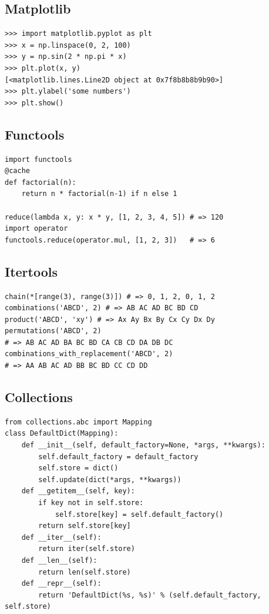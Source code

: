 \documentclass{article}
\begin{document}
\begin{multicols*}{4}
\subsection*{Matplotlib}
\begin{lstlisting}
>>> import matplotlib.pyplot as plt
>>> x = np.linspace(0, 2, 100)
>>> y = np.sin(2 * np.pi * x)
>>> plt.plot(x, y)
[<matplotlib.lines.Line2D object at 0x7f8b8b8b9b90>]
>>> plt.ylabel('some numbers')
>>> plt.show()
\end{lstlisting}

\subsection*{Functools}
\begin{lstlisting}
import functools 
@cache
def factorial(n):
    return n * factorial(n-1) if n else 1

reduce(lambda x, y: x * y, [1, 2, 3, 4, 5]) # => 120
import operator 
functools.reduce(operator.mul, [1, 2, 3])   # => 6
\end{lstlisting}

\subsection*{Itertools}
\begin{lstlisting}
chain(*[range(3), range(3)]) # => 0, 1, 2, 0, 1, 2
combinations('ABCD', 2) # => AB AC AD BC BD CD
product('ABCD', 'xy') # => Ax Ay Bx By Cx Cy Dx Dy
permutations('ABCD', 2) 
# => AB AC AD BA BC BD CA CB CD DA DB DC
combinations_with_replacement('ABCD', 2) 
# => AA AB AC AD BB BC BD CC CD DD
\end{lstlisting}

\subsection*{Collections}
\begin{lstlisting}
from collections.abc import Mapping
class DefaultDict(Mapping):
    def __init__(self, default_factory=None, *args, **kwargs):
        self.default_factory = default_factory
        self.store = dict()
        self.update(dict(*args, **kwargs))
    def __getitem__(self, key):
        if key not in self.store:
            self.store[key] = self.default_factory()
        return self.store[key]
    def __iter__(self):
        return iter(self.store)
    def __len__(self):
        return len(self.store)
    def __repr__(self):
        return 'DefaultDict(%s, %s)' % (self.default_factory, self.store)
\end{lstlisting}


\end{multicols*}
\end{document}
